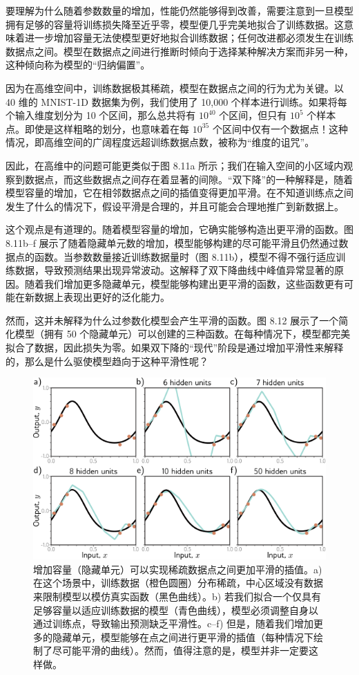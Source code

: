 要理解为什么随着参数数量的增加，性能仍然能够得到改善，需要注意到一旦模型拥有足够的容量将训练损失降至近乎零，模型便几乎完美地拟合了训练数据。这意味着进一步增加容量无法使模型更好地拟合训练数据；任何改进都必须发生在训练数据点之间。模型在数据点之间进行推断时倾向于选择某种解决方案而非另一种，这种倾向称为模型的“归纳偏置”。

因为在高维空间中，训练数据极其稀疏，模型在数据点之间的行为尤为关键。以 40 维的 MNIST-1D 数据集为例，我们使用了 10,000 个样本进行训练。如果将每个输入维度划分为 10 个区间，那么总共将有 $10^40$ 个区间，但只有 $10^5$ 个样本点。即使是这样粗略的划分，也意味着在每 $10^35$ 个区间中仅有一个数据点！这种情况，即高维空间的广阔程度远超训练数据点数，被称为“维度的诅咒”。

因此，在高维中的问题可能更类似于图 8.11a 所示；我们在输入空间的小区域内观察到数据点，而这些数据点之间存在着显著的间隙。“双下降”的一种解释是，随着模型容量的增加，它在相邻数据点之间的插值变得更加平滑。在不知道训练点之间发生了什么的情况下，假设平滑是合理的，并且可能会合理地推广到新数据上。

这个观点是有道理的。随着模型容量的增加，它确实能够构造出更平滑的函数。图 8.11b–f 展示了随着隐藏单元数的增加，模型能够构建的尽可能平滑且仍然通过数据点的函数。当参数数量接近训练数据量时（图 8.11b），模型不得不强行适应训练数据，导致预测结果出现异常波动。这解释了双下降曲线中峰值异常显著的原因。随着我们增加更多隐藏单元，模型能够构建出更平滑的函数，这些函数更有可能在新数据上表现出更好的泛化能力。

然而，这并未解释为什么过参数化模型会产生平滑的函数。图 8.12 展示了一个简化模型（拥有 50 个隐藏单元）可以创建的三种函数。在每种情况下，模型都完美拟合了数据，因此损失为零。如果双下降的“现代”阶段是通过增加平滑性来解释的，那么是什么驱使模型趋向于这种平滑性呢？

\begin{figure}[ht!]
\centering
\includegraphics[width=0.7\linewidth]{png/chapter8/PerfSmoothness.png}
\caption{增加容量（隐藏单元）可以实现稀疏数据点之间更加平滑的插值。a) 在这个场景中，训练数据（橙色圆圈）分布稀疏，中心区域没有数据来限制模型以模仿真实函数（黑色曲线）。b) 若我们拟合一个仅具有足够容量以适应训练数据的模型（青色曲线），模型必须调整自身以通过训练点，导致输出预测缺乏平滑性。c–f) 但是，随着我们增加更多的隐藏单元，模型能够在点之间进行更平滑的插值（每种情况下绘制了尽可能平滑的曲线）。然而，值得注意的是，模型并非一定要这样做。}
\end{figure}


